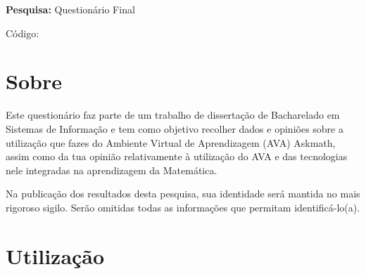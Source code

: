\label{ap:questionario_final}

\noindent \textbf{Pesquisa:} Questionário Final


\noindent
Código: 

\section{Sobre}

Este questionário faz parte de um trabalho de dissertação de Bacharelado em Sistemas de Informação e tem como objetivo 
recolher dados e opiniões sobre a utilização que fazes do Ambiente Virtual de Aprendizagem (AVA) Askmath, assim como da tua opinião relativamente à utilização do AVA e das 
tecnologias nele integradas na aprendizagem da Matemática.

Na publicação dos resultados desta pesquisa, sua identidade será mantida no mais rigoroso sigilo. Serão omitidas todas as informações que permitam identificá-lo(a). 

\section{Utilização}

